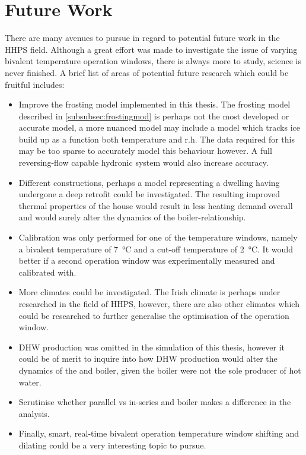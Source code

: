 \section{Future Work}
There are many avenues to pursue in regard to potential future work in the \ac{HHPS} field. Although a great effort was made to investigate the issue of varying bivalent temperature operation windows, there is always more to study, science is never finished. A brief list of areas of potential future research which could be fruitful includes:
\begin{itemize}
    \item Improve the frosting model implemented in this thesis. The frosting model described in \cref{subsubsec:frostingmod} is perhaps not the most developed or accurate model, a more nuanced model may include a model which tracks ice build up as a function both temperature and r.h. The data required for this may be too sparse to accurately model this behaviour however. A full reversing-flow capable hydronic system would also increase accuracy.
    \item Different constructions, perhaps a model representing a dwelling having undergone a deep retrofit could be investigated. The resulting improved thermal properties of the house would result in less heating demand overall and would surely alter the dynamics of the boiler-\HP relationship.
    \item Calibration was only performed for one of the temperature windows, namely a bivalent temperature of \qty{7}{\celsius} and a cut-off temperature of \qty{2}{\celsius}. It would better if a second operation window was experimentally measured and calibrated with. 
    \item More climates could be investigated. The Irish climate is perhaps under researched in the field of \ac{HHPS}, however, there are also other climates which could be researched to further generalise the optimisation of the operation window.
    \item \ac{DHW} production was omitted in the simulation of this thesis, however it could be of merit to inquire into how  \ac{DHW} production would alter the dynamics of the \HP and boiler, given the boiler were not the sole producer of hot water.
    \item Scrutinise whether parallel vs in-series \HP and boiler makes a difference in the analysis.
    \item Finally, smart, real-time bivalent operation temperature window shifting and dilating could be a very interesting topic to pursue. 
\end{itemize}

